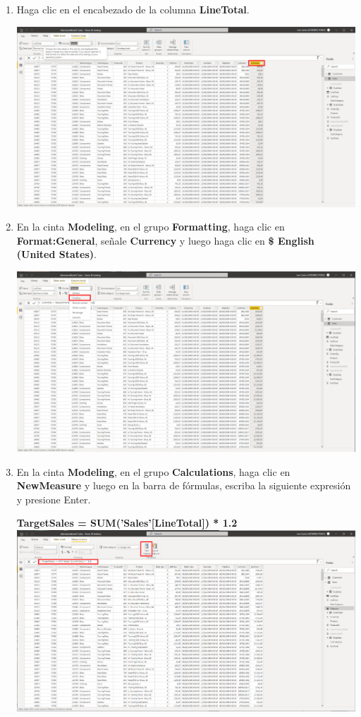 \documentclass[12pt,letterpaper]{article}
\newcommand\tab[1][1cm]{\hspace*{#1}}
\begin{document}
\begin{enumerate}[\tab 1.]
\begin{center}
        \end{center}
        \item Haga clic en el encabezado de la columna \textbf{LineTotal}.
        \begin{center}
            \includegraphics[width=13cm]{./img/img44.png}
        \end{center}
        \item En la cinta \textbf{Modeling}, en el grupo \textbf{Formatting}, haga clic en \textbf{Format:General}, señale \textbf{Currency} y luego haga clic en \textbf{\$ English (United States)}.
        \begin{center}
            \includegraphics[width=13cm]{./img/img45.png}
        \end{center}
        \item En la cinta \textbf{Modeling}, en el grupo \textbf{Calculations}, haga clic en \textbf{NewMeasure} y luego en la barra de fórmulas, escriba la siguiente expresión y presione Enter.
        \begin{center}
            \textbf{TargetSales = SUM('Sales'[LineTotal]) * 1.2}
            \includegraphics[width=13cm]{./img/img46.png}

\end{center}
\end{enumerate}
\end{document}
